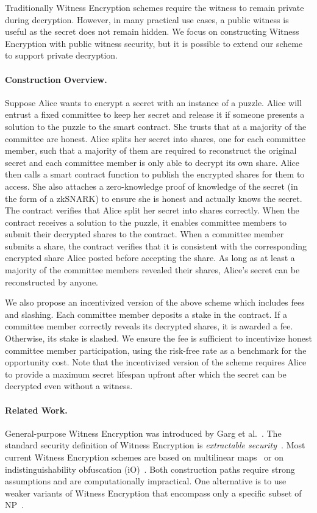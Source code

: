 Traditionally Witness Encryption schemes require the witness to remain private during decryption.
However, in many practical use cases, a public witness is useful as the secret does not remain hidden.
We focus on constructing Witness Encryption with public witness security, but it is possible to extend our scheme to support private decryption.

\paragraph{Construction Overview.}
Suppose Alice wants to encrypt a secret with an instance of a puzzle.
Alice will entrust a fixed committee to keep her secret and release it if someone presents a solution to the puzzle to the smart contract.
She trusts that at a majority of the committee are honest.
Alice splits her secret into shares, one for each committee member, such that a majority of them are required to reconstruct the original secret and each committee member is only able to decrypt its own share.
Alice then calls a smart contract function to publish the encrypted shares for them to access.
She also attaches a zero-knowledge proof of knowledge of the secret (in the form of a zkSNARK) to ensure she is honest and actually knows the secret.
The contract verifies that Alice split her secret into shares correctly.
When the contract receives a solution to the puzzle, it enables committee members to submit their decrypted shares to the contract.
When a committee member submits a share, the contract verifies that it is consistent with the corresponding encrypted share Alice posted before accepting the share.
As long as at least a majority of the committee members revealed their shares, Alice's secret can be reconstructed by anyone.

We also propose an incentivized version of the above scheme which includes fees and slashing.
Each committee member deposits a stake in the contract.
If a committee member correctly reveals its decrypted shares, it is awarded a fee.
Otherwise, its stake is slashed.
We ensure the fee is sufficient to incentivize honest committee member participation, using the risk-free rate as a benchmark for the opportunity cost.
Note that the incentivized version of the scheme requires Alice to provide a maximum secret lifespan upfront after which the secret can be decrypted even without a witness.

\paragraph{Related Work.}
General-purpose Witness Encryption was introduced by Garg et al.~\cite{witness_encryption}.
The standard security definition of Witness Encryption is \emph{extractable security}~\cite{turing_machine_fe}.
Most current Witness Encryption schemes are based on multilinear maps~\cite{witness_encryption,we_multilinear_map} or on indistinguishability obfuscation (iO)~\cite{we_io}. Both construction paths require strong assumptions and are computationally impractical.
One alternative is to use weaker variants of Witness Encryption that encompass only a specific subset of \textsf{NP}~\cite{MrNISC}.

